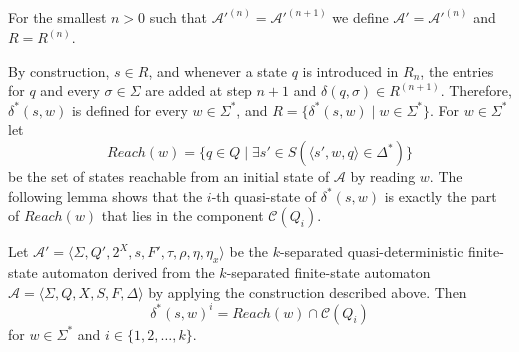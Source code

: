 For the smallest $n > 0$ such that $\mathcal{A}'^{(n)} = \mathcal{A}'^{(n+1)}$ we
define $\mathcal{A}' = \mathcal{A}'^{(n)}$ and $R = R^{(n)}$.

By construction, $s \in R$, and whenever a state $q$ is introduced in $R_n$, the
entries for $q$ and every $\sigma \in \Sigma$ are added at step $n + 1$ and $\delta(q,
\sigma) \in R^{(n+1)}$. Therefore, $\delta^*(s, w)$ is defined for every $w \in
\Sigma^*$, and $R = \{ \delta^*(s, w) \mid w \in \Sigma^* \}$.
For $w \in \Sigma^*$ let
\begin{equation*}
  Reach(w) = \{ q \in Q \mid \exists s' \in S (\langle s', w, q \rangle \in \Delta^*)
  \}
\end{equation*}
be the set of states reachable from an initial state of $\mathcal{A}$ by reading $w$.
The following lemma shows that the $i$-th quasi-state of $\delta^*(s, w)$ is exactly
the part of $Reach(w)$ that lies in the component $\mathcal{C}(Q_i)$.

\begin{lemma}\label{lem:quasidet_invariant}
  Let $\mathcal{A}' = \langle \Sigma, Q', 2^X, s, F', \tau, \rho, \eta, \eta_x
  \rangle$ be the $k$-separated quasi-deterministic finite-state automaton derived
  from the $k$-separated finite-state automaton $\mathcal{A} = \langle \Sigma, Q, X,
  S, F, \Delta \rangle$ by applying the construction described above. Then
  \begin{equation*}
    \delta^*(s, w)^i = Reach(w) \cap \mathcal{C}(Q_i)
  \end{equation*}
  for $w \in \Sigma^*$ and $i \in \{ 1, 2, \ldots, k \}$.
\end{lemma}

